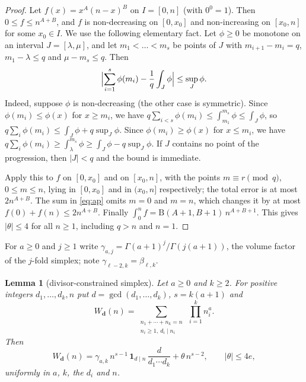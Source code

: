 \documentclass[11pt,a4paper]{article}
\newtheorem{lemma}[theorem]{Lemma}
\theoremstyle{remark}
\numberwithin{equation}{section}
\newcommand{\one}{\mathbf 1}
\begin{document}
\begin{proof}
Let $f(x)=x^A(n-x)^B$ on $I=[0,n]$ (with $0^0=1$). Then $0\le f\le n^{A+B}$, and $f$ is non-decreasing on $[0,x_0]$ and non-increasing on $[x_0,n]$ for some $x_0\in I$. We use the following elementary fact. Let $\phi\ge0$ be monotone on an interval $J=[\lambda,\mu]$, and let $m_1<\dots<m_s$ be points of $J$ with $m_{i+1}-m_i=q$, $m_1-\lambda\le q$ and $\mu-m_s\le q$. Then
\[
\Bigl|\sum_{i=1}^s\phi(m_i)-\frac1q\int_J\phi\Bigr|\le\sup_J\phi .
\]
Indeed, suppose $\phi$ is non-decreasing (the other case is symmetric). Since $\phi(m_i)\le\phi(x)$ for $x\ge m_i$, we have $q\sum_{i<s}\phi(m_i)\le\int_{m_1}^{m_s}\phi\le\int_J\phi$, so $q\sum_i\phi(m_i)\le\int_J\phi+q\sup_J\phi$. Since $\phi(m_i)\ge\phi(x)$ for $x\le m_i$, we have $q\sum_{i}\phi(m_i)\ge\int_\lambda^{m_s}\phi\ge\int_J\phi-q\sup_J\phi$. If $J$ contains no point of the progression, then $|J|<q$ and the bound is immediate.

Apply this to $f$ on $[0,x_0]$ and on $[x_0,n]$, with the points $m\equiv r\pmod q$, $0\le m\le n$, lying in $[0,x_0]$ and in $(x_0,n]$ respectively; the total error is at most $2n^{A+B}$. The sum in \eqref{eq:ap} omits $m=0$ and $m=n$, which changes it by at most $f(0)+f(n)\le2n^{A+B}$. Finally $\int_0^nf=\mathrm B(A+1,B+1)\,n^{A+B+1}$. This gives $|\theta|\le4$ for all $n\ge1$, including $q>n$ and $n=1$.
\end{proof}

For $a\ge0$ and $j\ge1$ write $\gamma_{a,j}=\Gamma(a+1)^j/\Gamma(j(a+1))$, the volume factor of the $j$-fold simplex; note $\gamma_{\ell-2,k}=\beta_{\ell,k}$.

\begin{lemma}[divisor-constrained simplex]\label{lem:simplex}
Let $a\ge0$ and $k\ge2$. For positive integers $d_1,\ldots,d_k,n$ put $d=\gcd(d_1,\ldots,d_k)$, $s=k(a+1)$ and
\[
W_{\mathbf d}(n)=\sum_{\substack{n_1+\cdots+n_k=n\\ n_i\ge1,\ d_i\mid n_i}}\ \prod_{i=1}^kn_i^{a}.
\]
Then
\begin{equation}\label{eq:simplex}
W_{\mathbf d}(n)=\gamma_{a,k}\,n^{s-1}\,\one_{d\mid n}\,\frac{d}{d_1\cdots d_k}+\theta\,n^{s-2},\qquad|\theta|\le4e,
\end{equation}
uniformly in $a$, $k$, the $d_i$ and $n$.
\end{lemma}
\end{document}
